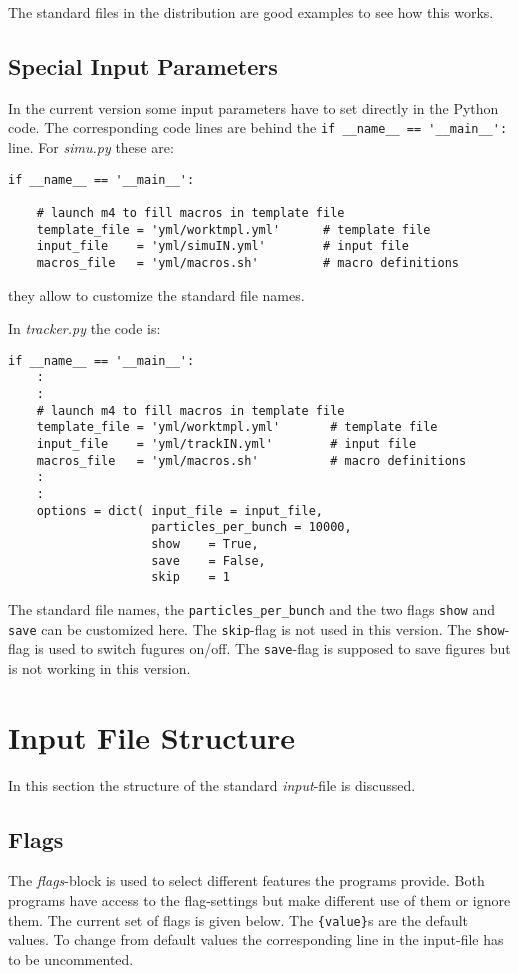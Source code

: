 \documentclass[10pt]{article}
\begin{document}
The standard files in the distribution are good examples to see how this works.

\subsection{Special Input Parameters}
In the current version some input parameters have to set directly in the Python code. The corresponding code lines are behind the \verb+if __name__ == '__main__':+ line. For
\emph{simu.py} these are:
\begin{verbatim}
if __name__ == '__main__':

    # launch m4 to fill macros in template file
    template_file = 'yml/worktmpl.yml'      # template file
    input_file    = 'yml/simuIN.yml'        # input file
    macros_file   = 'yml/macros.sh'         # macro definitions
\end{verbatim}
they allow to customize the standard file names.

In \emph{tracker.py} the code is:
\begin{verbatim}
if __name__ == '__main__':
    :
    :    
    # launch m4 to fill macros in template file
    template_file = 'yml/worktmpl.yml'       # template file
    input_file    = 'yml/trackIN.yml'        # input file
    macros_file   = 'yml/macros.sh'          # macro definitions
    :    
    :    
    options = dict( input_file = input_file,
                    particles_per_bunch = 10000,
                    show    = True,
                    save    = False,
                    skip    = 1
\end{verbatim}
The standard file names, the \verb+particles_per_bunch+ and the two flags \verb+show+ and
\verb+save+ can be customized here. The \verb+skip+-flag is not used in this version.
The \verb+show+-flag is used to switch fugures on/off. The \verb+save+-flag is supposed
to save figures but is not working in this version.

\section{Input File Structure}
In this section the structure of the standard \emph{input}-file is discussed.
\subsection{Flags}
The \emph{flags}-block is used to select different features the programs provide. Both 
programs have access to the flag-settings but make different use of them or ignore them.
The current set of flags is given below. The \verb+{value}+s are the default values. To change from default values the corresponding line in the input-file has to be uncommented.
\end{document}
